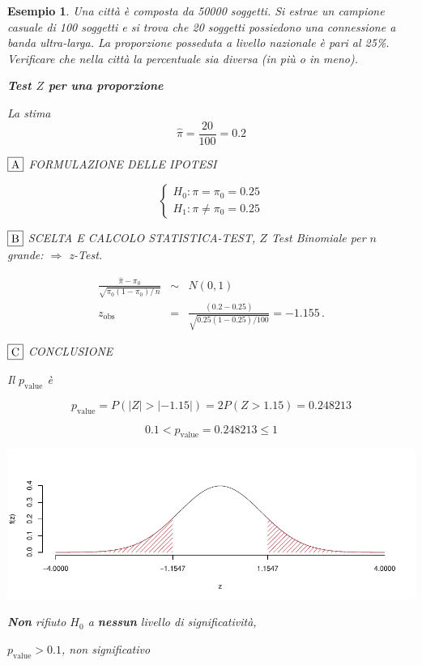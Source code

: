 \documentclass[
  11pt,
]{book}
\theoremstyle{mytheoremstyle}
\theoremstyle{mydefstyle}
\newtheorem{example}{{Esempio}}[section]
\begin{document}
\begin{example}
Una città è composta da 50000 soggetti. Si estrae un campione casuale di
100 soggetti e si trova che 20 soggetti possiedono una connessione a
banda ultra-larga. La proporzione posseduta a livello nazionale è pari
al 25\%. Verificare che nella città la
percentuale sia diversa (in più o in meno).

\textbf{Test \(Z\) per una proporzione}

La stima
\[\hat\pi=\frac { 20 } { 100 }= 0.2  \]

\(\fbox{A}\) FORMULAZIONE DELLE IPOTESI

\[\begin{cases}
   H_0: \pi = \pi_0=0.25 \\
   H_1: \pi \neq \pi_0=0.25 
   \end{cases}\]

\(\fbox{B}\) SCELTA E CALCOLO STATISTICA-TEST, \(Z\)
Test Binomiale per \(n\) grande: \(\Rightarrow\) z-Test.

\begin{eqnarray*}
   \frac{\hat\pi - \pi_{0}} {\sqrt {\pi_0(1-\pi_0)/\,n}}&\sim&N(0,1)\\
   z_{\text{obs}}
   &=& \frac{ ( 0.2 -  0.25 )} {\sqrt{ 0.25 (1- 0.25 )/ 100 }}
   =   -1.155 \,.
   \end{eqnarray*}

\(\fbox{C}\) CONCLUSIONE

Il \(p_{\text{value}}\) è

\[ p_{\text{value}} = P(|Z|>|-1.15|)=2P(Z>1.15)=0.248213 \]

\[
 0.1 < p_\text{value}= 0.248213 \leq 1 
\]

\begin{center}\includegraphics{Appunti_di_Statistica_2025_files/figure-latex/15-test-mu-pi-13-1} \end{center}

\textbf{Non} rifiuto \(H_0\) a \textbf{nessun}
livello di significatività,

\(p_\text{value}>0.1\),
\emph{non significativo}
\end{example}
\end{document}
